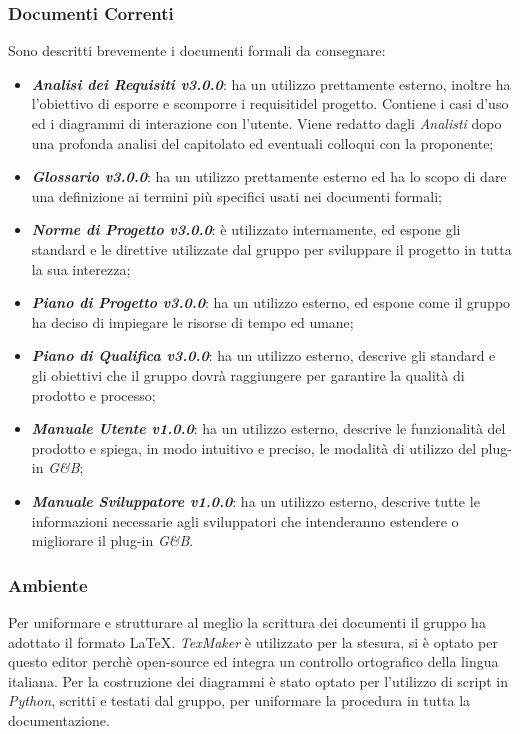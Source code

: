 \subsubsection{Documenti Correnti}
\label{ProcessiSupporto_Documentazione_DocumentiCorrenti}
Sono descritti brevemente i documenti formali da consegnare:
\begin{itemize}
	\item \textbf{\textit{Analisi dei Requisiti v3.0.0}}: ha un utilizzo prettamente esterno, inoltre ha l'obiettivo di esporre e scomporre i requisiti\glossario del progetto. Contiene i casi d'uso ed i diagrammi di interazione con l'utente. Viene redatto dagli \textit{Analisti} dopo una profonda analisi del capitolato ed eventuali colloqui con la proponente;
	\item \textbf{\textit{Glossario v3.0.0}}: ha un utilizzo prettamente esterno ed ha lo scopo di dare una definizione ai termini più specifici usati nei documenti formali;
	\item \textbf{\textit{Norme di Progetto v3.0.0}}: è utilizzato internamente, ed espone gli standard e le direttive utilizzate dal gruppo per sviluppare il progetto in tutta la sua interezza;
	\item \textbf{\textit{Piano di Progetto v3.0.0}}: ha un utilizzo esterno, ed espone come il gruppo ha deciso di impiegare le risorse di tempo ed umane;
	\item \textbf{\textit{Piano di Qualifica v3.0.0}}: ha un utilizzo esterno, descrive gli standard e gli obiettivi che il gruppo dovrà raggiungere per garantire la qualità di prodotto e processo;
	\item \textbf{\textit{Manuale Utente v1.0.0}}: ha un utilizzo esterno, descrive le funzionalità del prodotto e spiega, in modo intuitivo e preciso, le modalità di utilizzo del plug-in \textit{G\&B};
	\item \textbf{\textit{Manuale Sviluppatore v1.0.0}}: ha un utilizzo esterno, descrive tutte le informazioni necessarie agli sviluppatori che intenderanno estendere o migliorare il plug-in \textit{G\&B}.
\end{itemize}

\subsubsection{Ambiente}\label{ProcessiSupporto_Documentazione_Ambiente}
Per uniformare e strutturare al meglio la scrittura dei documenti il gruppo ha adottato il formato \LaTeX.
\textit{TexMaker} è utilizzato per la stesura, si è optato per questo editor perchè open-source ed integra un controllo ortografico della lingua italiana.
Per la costruzione dei diagrammi è stato optato per l'utilizzo di script in \textit{Python}, scritti e testati dal gruppo, per uniformare la procedura in tutta la documentazione.

